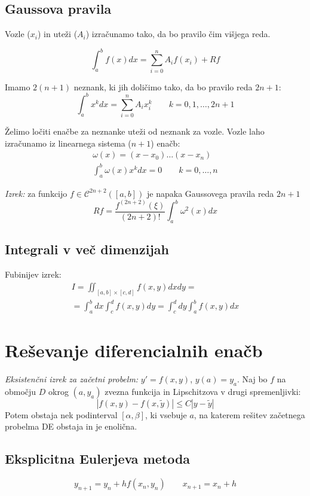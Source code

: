 \begin{multicols}{5}
\subsection*{Gaussova pravila}
Vozle ($x_i$) in uteži ($A_i$) izračunamo tako, da bo pravilo čim višjega reda.

\[ \int_a^b f(x) dx = \sum_{i=0}^n A_i f(x_i) + Rf \]

Imamo $2(n+1)$ neznank, ki jih doličimo tako, da bo pravilo reda $2n+1$:
\[ \int_a^b x^k dx = \sum_{i=0}^n A_i x_i^k \qquad k=0,1,\dots, 2n+1\]

Želimo ločiti enačbe za neznanke uteži od neznank za vozle. Vozle laho izračunamo iz linearnega sistema ($n+1$) enačb:
\begin{align*}
    \omega(x) = (x-x_0)\dots (x-x_n) \\
    \int_a^b \omega(x) x^k dx = 0 \qquad k = 0,\dots, n
\end{align*}

\textit{Izrek:} za funkcijo $f \in \mathcal{C}^{2n+2}([a,b])$ je napaka Gaussovega pravila reda $2n+1$
\[ Rf = \frac{f^{(2n+2)}(\xi)}{(2n+2)!} \int_a^b \omega^2(x) dx \]

\subsection*{Integrali v več dimenzijah}
Fubinijev izrek:
\begin{multline*}
    I = \iint_{[a,b]\times [c,d]} f(x, y) dx dy = \\ 
    = \int_a^b dx \int_c^d f(x,y) dy = \int_c^d dy \int_a^b f(x, y) dx
\end{multline*}


\section*{Reševanje diferencialnih enačb}


\textit{Eksistenčni izrek za začetni probelm:} $y' = f(x,y)$, $y(a) = y_a$. Naj bo $f$
na območju $D$ okrog $(a, y_a)$ zvezna funkcija in Lipschitzova v drugi spremenljivki:
\[ |f(x,y) - f(x, \tilde{y}) | \leq C |y-\tilde{y}| \]
Potem obstaja nek podinterval $[\alpha, \beta]$, ki vsebuje $a$, na katerem rešitev
začetnega probelma DE obstaja in je enolična.
%

\subsection*{Eksplicitna Eulerjeva metoda}
\[ y_{n+1} = y_n + h f(x_n, y_n) \qquad x_{n+1} = x_n + h\]


\end{multicols}
